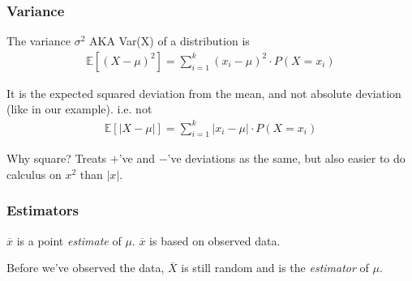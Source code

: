 \documentclass[handout]{beamer}
\newcommand{\blue}[1]{\textcolor{blue2}{#1}}
\newcommand{\xbar}{\overline{x}}
\newcommand{\E}{\mathbb{E}}
\begin{document}
\begin{frame}
\frametitle{Variance}
%
%
The variance $\sigma^2$ AKA Var(X) of a distribution is
\begin{eqnarray*}
\E\left[(X-\mu)^2\right] = \sum_{i=1}^k (x_i-\mu)^2 \cdot P(X=x_i)
\end{eqnarray*}

\pause\vspace{0.5cm}

It is the expected \blue{squared} deviation from the mean, and not \blue{absolute} deviation (like in our example).  i.e. not
\begin{eqnarray*}
\E\left[|X-\mu|\right] = \sum_{i=1}^k |x_i-\mu| \cdot P(X=x_i)
\end{eqnarray*}

\pause \vspace{0.5cm}
Why square?  Treats $+$'ve and $-$'ve deviations as the same, but also easier to do calculus on $x^2$ than $|x|$.

\end{frame}


\begin{frame}
\frametitle{Estimators}

%
%
$\xbar$ is a point \textit{estimate} of $\mu$.   $\xbar$ is based on \blue{observed data}.

\pause
\vspace{0.25cm}

Before we've observed the data, $\overline{X}$ is still random and is the \textit{estimator} of $\mu$.

\end{frame}
\end{document}
